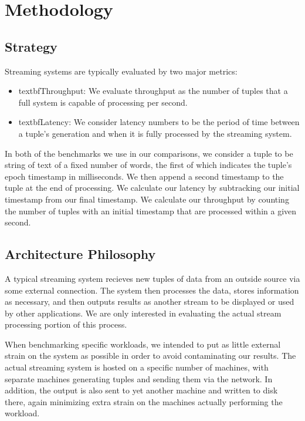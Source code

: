 \section{Methodology}
\subsection{Strategy}
Streaming systems are typically evaluated by two major metrics:
\begin{itemize}
\item textbf{Throughput:} We evaluate throughput as the number of tuples that a full system is capable of processing per second.
\item textbf{Latency:} We consider latency numbers to be the period of time between a tuple's generation and when it is fully processed by the streaming system.
\end{itemize}

In both of the benchmarks we use in our comparisons, we consider a tuple to be string of text of a fixed number of words, the first of which indicates the tuple's epoch timestamp in milliseconds.  We then append a second timestamp to the tuple at the end of processing.  We calculate our latency by subtracking our initial timestamp from our final timestamp.  We calculate our throughput by counting the number of tuples with an initial timestamp that are processed within a given second.

\subsection{Architecture Philosophy}
A typical streaming system recieves new tuples of data from an outside source via some external connection.  The system then processes the data, stores information as necessary, and then outputs results as another stream to be displayed or used by other applications.  We are only interested in evaluating the actual stream processing portion of this process.

When benchmarking specific workloads, we intended to put as little external strain on the system as possible in order to avoid contaminating our results.  The actual streaming system is hosted on a specific number of machines, with separate machines generating tuples and sending them via the network.  In addition, the output is also sent to yet another machine and written to disk there, again minimizing extra strain on the machines actually performing the workload.



